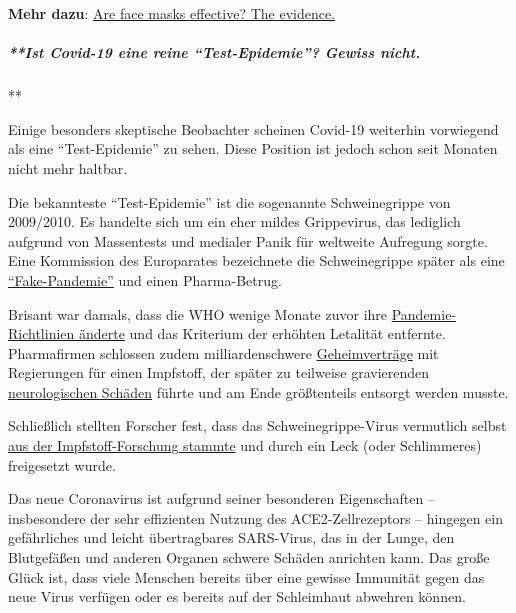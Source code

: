 \textbf{Mehr dazu}: \href{https://swprs.org/face-masks-evidence/}{Are
face masks effective? The evidence.}

\hypertarget{ist-covid-19-eine-reine-test-epidemie-gewiss-nicht}{%
\subparagraph{**Ist Covid-19 eine reine ``Test-Epidemie''? Gewiss
nicht.}\label{ist-covid-19-eine-reine-test-epidemie-gewiss-nicht}}

**

Einige besonders skeptische Beobachter scheinen Covid-19 weiterhin
vorwiegend als eine ``Test-Epidemie'' zu sehen. Diese Position ist
jedoch schon seit Monaten nicht mehr haltbar.

Die bekannteste ``Test-Epidemie'' ist die sogenannte Schweinegrippe von
2009/2010. Es handelte sich um ein eher mildes Grippevirus, das
lediglich aufgrund von Massentests und medialer Panik für weltweite
Aufregung sorgte. Eine Kommission des Europarates bezeichnete die
Schweinegrippe später als eine
\href{https://www.forbes.com/2010/02/05/world-health-organization-swine-flu-pandemic-opinions-contributors-michael-fumento.html\#658c006c48e8}{``Fake-Pandemie''}
und einen Pharma-Betrug.

Brisant war damals, dass die WHO wenige Monate zuvor ihre
\href{https://www.forbes.com/2010/02/05/world-health-organization-swine-flu-pandemic-opinions-contributors-michael-fumento.html\#658c006c48e8}{Pandemie-Richtlinien
änderte} und das Kriterium der erhöhten Letalität entfernte.
Pharmafirmen schlossen zudem milliarden­schwere
\href{https://www.dailymail.co.uk/news/article-1242147/The-false-pandemic-Drug-firms-cashed-scare-swine-flu-claims-Euro-health-chief.html}{Geheimverträge}
mit Regierungen für einen Impfstoff, der später zu teilweise
gravierenden
\href{https://www.ibtimes.co.uk/brain-damaged-uk-victims-swine-flu-vaccine-get-60-million-compensation-1438572}{neurologischen
Schäden} führte und am Ende größtenteils entsorgt werden musste.

Schließlich stellten Forscher fest, dass das Schweinegrippe-Virus
vermutlich selbst
\href{https://link.springer.com/article/10.1186/1743-422X-6-207}{aus der
Impfstoff-Forschung stammte} und durch ein Leck (oder Schlimmeres)
freigesetzt wurde.

Das neue Coronavirus ist aufgrund seiner besonderen Eigenschaften --
insbesondere der sehr effizienten Nutzung des ACE2-Zellrezeptors --
hingegen ein gefährliches und leicht übertragbares SARS-Virus, das in
der Lunge, den Blutgefäßen und anderen Organen schwere Schäden anrichten
kann. Das große Glück ist, dass viele Menschen bereits über eine gewisse
Immunität gegen das neue Virus verfügen oder es bereits auf der
Schleimhaut abwehren können.

